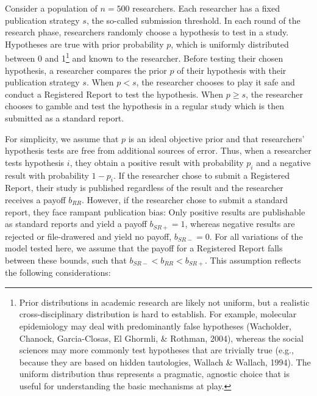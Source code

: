 \documentclass[
  ,man,mask,floatsintext]{apa6}
\begin{document}
Consider a population of \(n = 500\) researchers.
Each researcher has a fixed publication strategy \(s\), the so-called submission threshold.
In each round of the research phase, researchers randomly choose a hypothesis to test in a study.
Hypotheses are true with prior probability \(p\), which is uniformly distributed between 0 and 1\footnote{Prior distributions in academic research are likely not uniform, but a realistic cross-disciplinary distribution is hard to establish. For example, molecular epidemiology may deal with predominantly false hypotheses (Wacholder, Chanock, Garcia-Closas, El Ghormli, \& Rothman, 2004), whereas the social sciences may more commonly test hypotheses that are trivially true (e.g., because they are based on hidden tautologies, Wallach \& Wallach, 1994). The uniform distribution thus represents a pragmatic, agnostic choice that is useful for understanding the basic mechanisms at play.} and known to the researcher.
Before testing their chosen hypothesis, a researcher compares the prior \(p\) of their hypothesis with their publication strategy \(s\).
When \(p < s\), the researcher chooses to play it safe and conduct a Registered Report to test the hypothesis.
When \(p \geq s\), the researcher chooses to gamble and test the hypothesis in a regular study which is then submitted as a standard report.

For simplicity, we assume that \(p\) is an ideal objective prior and that researchers' hypothesis tests are free from additional sources of error.
Thus, when a researcher tests hypothesis \(i\), they obtain a positive result with probability \(p_i\) and a negative result with probability \(1-p_i\).
If the researcher chose to submit a Registered Report, their study is published regardless of the result and the researcher receives a payoff \(b_{RR}\).
However, if the researcher chose to submit a standard report, they face rampant publication bias:
Only positive results are publishable as standard reports and yield a payoff \(b_{SR+} = 1\), whereas negative results are rejected or file-drawered and yield no payoff, \(b_{SR-} = 0\).
For all variations of the model tested here, we assume that the payoff for a Registered Report falls between these bounds, such that \(b_{SR-} < b_{RR} < b_{SR+}\).
This assumption reflects the following considerations:
\end{document}
